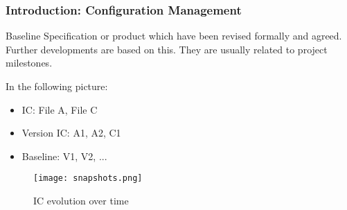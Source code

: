 \begin{frame}

\frametitle{Introduction: Configuration Management}

\begin{block}{Baseline}
Specification or product which have been revised formally and agreed. Further developments are based on this. They are usually related to project milestones.
\end{block}

\begin{multicols}{2}

In the following picture:
\begin{itemize}
\item IC: File A, File C
\item Version IC: A1, A2, C1
\item Baseline: V1, V2, ...
\end{itemize}
 
\columnbreak

\begin{figure}[h]
\centering
\texttt{[image: snapshots.png]}
\caption{IC evolution over time}
\label{fig:snapshots}
\end{figure}

\end{multicols}
\end{frame}
